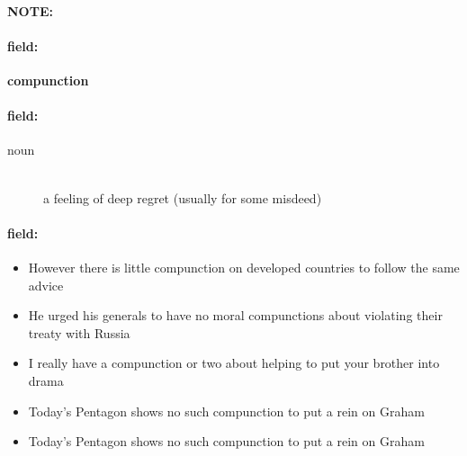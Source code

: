 \documentclass[12pt]{article}
\newenvironment{note}{\paragraph{NOTE:}}{}
\newenvironment{field}{\paragraph{field:}}{}
\begin{document}
\begin{note}
\begin{field}
\textbf{\large compunction}
\end{field}


\begin{field}
\begin{description}
\item[noun] \hfill \\ 
a feeling of deep regret (usually for some misdeed)

\end{description}
\end{field}

\begin{field}
\begin{itemize}
\item However there is little compunction on developed countries to follow the same advice
\item He urged his generals to have no moral compunctions about violating their treaty with Russia
\item I really have a compunction or two about helping to put your brother into drama
\item Today's Pentagon shows no such compunction to put a rein on Graham
\item Today's Pentagon shows no such compunction to put a rein on Graham
\end{itemize}
\end{field}
\end{note}
\end{document}
